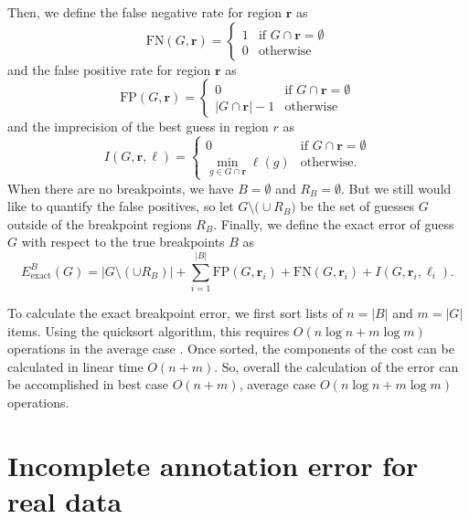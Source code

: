 \documentclass{jsfds} %
\renewcommand{\r}{ \mathbf{ r} }
\begin{document}
Then, we define the false negative rate for region $\r$ as 
\begin{equation}
  \label{eq:FN_i}
  \text{FN}(G,\r) = 
  \begin{cases}
    1 & \text{if } G\cap\r = \emptyset\\
    0 & \text{otherwise}
  \end{cases}
\end{equation}
and the false positive rate for region $\r$ as
\begin{equation}
  \label{eq:FP_i}
  \text{FP}(G,\r) =
  \begin{cases}
    0 & \text{if }G\cap\r = \emptyset\\
    |G\cap\r|-1 &\text{otherwise}
  \end{cases}
\end{equation}
and the imprecision of the best guess in region $r$ as
\begin{equation}
  \label{eq:imprecision}
  I(G,\r,\ell) =
  \begin{cases}
    0 & \text{if } G\cap\r = \emptyset\\
    \min_{g\in G\cap\r} \ell(g) & \text{otherwise}.
  \end{cases}
\end{equation}
When there are no breakpoints, we have $B=\emptyset$ and
$R_B=\emptyset$. But we still would like to quantify the false
positives, so let $G\setminus\big( \cup R_B\big) $ be the set of
guesses $G$ outside of the breakpoint regions $R_B$. Finally, we
define the exact error of guess $G$ with respect to the true
breakpoints $B$ as
\begin{equation}
  \label{eq:exact_breakpoint_cost}
  {E }_{\text{exact}}^B(G) =
  \big|G\setminus(\cup R_B)\big|
 + \sum_{i=1}^{|B|}\text{FP}(G,\r_i)+\text{FN}(G,\r_i)+I(G,\r_i,\ell_i).
\end{equation}

\newpage

To calculate the exact breakpoint error, we first sort lists of
$n=|B|$ and $m=|G|$ items. Using the quicksort algorithm, this
requires $O(n\log n + m\log m)$ operations in the average case
\citep{clrs}. Once sorted, the components of the cost can be
calculated in linear time $O(n + m)$. So, overall the calculation of
the error can be accomplished in best case $O(n + m)$, average case
$O(n\log n + m\log m)$ operations.

\newpage
\section{Incomplete annotation error for real data}
\label{sec:incomplete}
\end{document}
